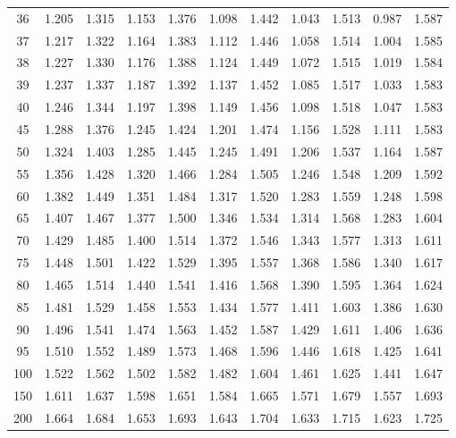 \documentclass[12pt]{article}
\begin{document}
\begin{table}
\begin{center}
{\begin{tabular}{|c|c|c|c|c|c|c|c|c|c|c|}
36&1.205&1.315&1.153&1.376&1.098&1.442&
1.043&1.513&0.987&1.587\\


37&1.217&1.322&1.164&1.383&1.112&1.446&1.058&1.514&
1.004&1.585\\

38&1.227&1.330&1.176&1.388&1.124&1.449&1.072&1.515&1.019&1.584\\

39&1.237&
1.337&1.187&1.392&1.137&1.452&1.085&1.517&1.033&1.583\\

40&1.246&1.344&1.197&
1.398&1.149&1.456&1.098&1.518&1.047&1.583\\


45&1.288&1.376&1.245&1.424&1.201&
1.474&1.156&1.528&1.111&1.583\\


50&1.324&1.403&1.285&1.445&1.245&1.491&1.206&
1.537&1.164&1.587\\


55&1.356&1.428&1.320&1.466&1.284&1.505&1.246&1.548&1.209&
1.592\\

60&1.382&1.449&1.351&1.484&1.317&1.520&1.283&1.559&1.248&1.598\\


65&1.407&1.467&1.377&1.500&1.346&1.534&1.314&1.568&1.283&1.604\\

70&1.429&1.485&1.400&1.514&
1.372&1.546&1.343&1.577&1.313&1.611\\

75&1.448&1.501&1.422&1.529&1.395&1.557&
1.368&1.586&1.340&1.617\\

80&1.465&1.514&1.440&1.541&1.416&1.568&1.390&1.595&
1.364&1.624\\

85&1.481&1.529&1.458&1.553&1.434&1.577&1.411&1.603&1.386&1.630\\


90&1.496&1.541&1.474&1.563&1.452&1.587&1.429&1.611&1.406&1.636\\

95&1.510&1.552&1.489&
1.573&1.468&1.596&1.446&1.618&1.425&1.641\\

100&1.522&1.562&1.502&1.582&
1.482&1.604&1.461&1.625&1.441&1.647\\

150&1.611&1.637&1.598&1.651&1.584&
1.665&1.571&1.679&1.557&1.693\\

200&1.664&1.684&1.653&1.693&1.643&1.704&
1.633&1.715&1.623&1.725\\

  \hline
\end{tabular}
}
\end{center}
\end{table}
\end{document}

